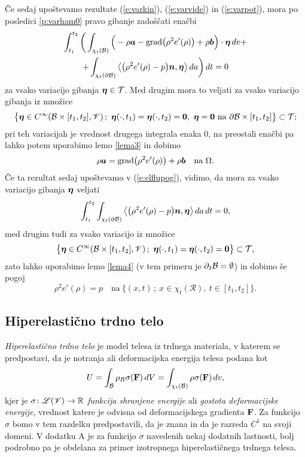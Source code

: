 Če sedaj upoštevamo rezultate (\ref{e:varkin}), (\ref{e:varvide}) in (\ref{e:varpot}),
mora po posledici \ref{p:varham0} pravo gibanje zadoščati enačbi
\begin{multline} \label{e:elflupog}
	\int_{t_1}^{t_2}\bigg( \int_{\chi_t(\mathcal B)}\Big(-\rho\boldsymbol a-
	\mathrm{grad}\big(\rho^2 e'(\rho)\big)+\rho\boldsymbol b\Big)\cdot\boldsymbol \eta\,dv+ \\
	+\int_{\chi_t(\partial \mathcal B)}\big<\big(\rho^2 e'(\rho)-p\big)\boldsymbol n,\boldsymbol \eta\big>\,da\bigg)\,dt=0
\end{multline}
za vsako variacijo gibanja $\boldsymbol \eta\in\mathcal{T}$. Med drugim mora to veljati za
vsako variacijo gibanja iz množice
\[
	\big\{ \vek{\eta}\in C^{\infty}(\B\times[t_1,t_2],\V)\,;\ \vek{\eta}(\cdot,t_1)=
	\vek{\eta}(\cdot,t_2)=\vek{0},\ \vek{\eta}=\vek{0}\ \textrm{na}\ \partial \B\times[t_1,t_2]
	\big\}\subset\mathcal{T};
\]
pri teh variacijah je vrednost drugega integrala enaka 0, na preostali enačbi
pa lahko potem uporabimo lemo \ref{lema3} in dobimo
\begin{equation*}
	\rho\boldsymbol a=\mathrm{grad}\big(\rho^2 e'(\rho)\big)+\rho\boldsymbol b\quad
	\textrm{na}\ \Omega.
\end{equation*}
Če ta rezultat sedaj upoštevamo v (\ref{e:elflupog}), vidimo, da mora
za vsako variacijo gibanja $\boldsymbol \eta$ veljati
\[
	\int_{t_1}^{t_2}\int_{\chi_t(\partial \mathcal B)}\big<\big(\rho^2 e'(\rho)-p\big)\boldsymbol n,\boldsymbol \eta\big>\,da\,dt=0,
\]
med drugim tudi za vsako variacijo iz množice
\[
	\big\{ \vek{\eta}\in C^{\infty}(\B\times[t_1,t_2],\V)\,;\ \vek{\eta}(\cdot,t_1)=
	\vek{\eta}(\cdot,t_2)=\vek{0} \big\}\subset\mathcal{T},
\]
zato lahko uporabimo lemo \ref{lema4} (v tem primeru je $\partial_1\mathcal B=\emptyset$) in dobimo še pogoj
\[
	\rho^2 e'(\rho)=p \quad\textrm{na}\ \{ (x,t)\,;\ x\in\chi_t(\mathcal{R}),\ t\in[t_1,t_2] \}.
\]


\subsection{Hiperelastično trdno telo}


\emph{Hiperelastično trdno telo} je model telesa iz trdnega materiala, v katerem se predpostavi,
da je notranja ali deformacijska energija telesa podana kot
\[ U=\int_{\mathcal B}\rho_R \sigma(\mathbf F)\,dV=\int_{\chi_t(\mathcal B)}\rho\sigma(\mathbf F)\,dv, \]
kjer je $\sigma\colon\mathscr L(\mathscr V)\to\mathbb R$ \emph{funkcija shranjene energije} ali \emph{gostota deformacijske energije},
vrednost katere je odvisna od
deformacijskega gradienta $\mathbf F$. Za funkcijo $\sigma$ bomo v tem razdelku predpostavili, da je znana in da je
razreda $C^1$ na svoji domeni. V dodatku A je za funkcijo $\sigma$ navedenih nekaj dodatnih lastnosti,
bolj podrobno pa je obdelana za primer izotropnega hiperelastičnega trdnega telesa.

